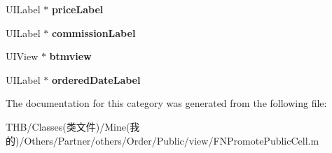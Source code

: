 \begin{DoxyCompactItemize}
U\+I\+Label $\ast$ {\bfseries price\+Label}
\item 
\mbox{\label{category_f_n_promote_public_cell_07_08_a96c7e1547db82464dcfff4146e5e0efc}} 
U\+I\+Label $\ast$ {\bfseries commission\+Label}
\item 
\mbox{\label{category_f_n_promote_public_cell_07_08_a79f0a77e679b10d60d2aabc7a39c0ec8}} 
U\+I\+View $\ast$ {\bfseries btmview}
\item 
\mbox{\label{category_f_n_promote_public_cell_07_08_a80cb54bf0ed3091c48dd2b5886875149}} 
U\+I\+Label $\ast$ {\bfseries ordered\+Date\+Label}
\end{DoxyCompactItemize}


The documentation for this category was generated from the following file\+:\begin{DoxyCompactItemize}
\item 
T\+H\+B/\+Classes(类文件)/\+Mine(我的)/\+Others/\+Partner/others/\+Order/\+Public/view/F\+N\+Promote\+Public\+Cell.\+m\end{DoxyCompactItemize}
